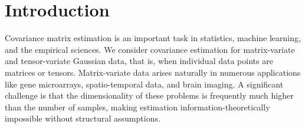\documentclass[aos]{imsart}
\theoremstyle{definition}
\numberwithin{equation}{section}
\begin{document}
\begin{frontmatter}
\begin{abstract}


\end{abstract}
\begin{keyword}[class=MSC2020]
\end{keyword}

\begin{keyword}
\end{keyword}
\end{frontmatter}
\tableofcontents


\section{Introduction}
Covariance matrix estimation is an important task in statistics, machine learning, and the empirical sciences.
We consider covariance estimation for matrix-variate and tensor-variate Gaussian data, that is, when individual data points are matrices or tensors. Matrix-variate data arises naturally in numerous applications like gene microarrays, spatio-temporal data, and brain imaging.
A significant challenge is that the dimensionality of these problems is frequently much higher than the number of samples, making estimation information-theoretically impossible without structural assumptions.
\end{document}
